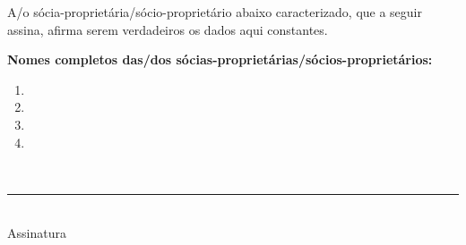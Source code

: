 \documentclass[openright, oneside, a4paper, article, brazil]{abntex2}
\begin{document}
\setasuspacing{\DoubleSpacing}A/o sócia-proprietária/sócio-proprietário abaixo caracterizado, que a seguir assina, afirma serem verdadeiros os dados aqui constantes.

\noindent \textbf{Nomes completos das/dos sócias-proprietárias/sócios-proprietários:}
\begin{enumerate}
\item {}
\item {}
\item {}
\item {}
\end{enumerate}
\raggedright\setasuspacing{\SingleSpacing}
\\
\vfill

\centering
\rule{24em}{0.4pt}\\
Assinatura
%
%
%
%
%
%
%
%
%
%
\end{document}
